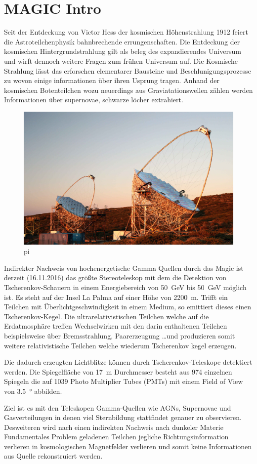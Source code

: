 \section{MAGIC Intro}%
\label{sec:magic}
Seit der Entdeckung von Victor Hess der kosmischen Höhenstrahlung 
1912 feiert die Astroteilchenphysik bahnbrechende errungenschaften.
Die Entdeckung der kosmischen Hintergrundstrahlung gilt als beleg des
expandierendes Universum und wirft dennoch weitere Fragen zum frühen Universum auf. 
Die Kosmische Strahlung lässt das erforschen elementarer Bausteine und
Beschlunigungsprozesse zu wovon
einige informationen über ihren Usprung tragen. 
Anhand der kosmischen Botenteilchen wozu neuerdings aus Graviatationswellen
zählen werden Informationen über supernovae, schwarze löcher extrahiert.
\begin{figure}
		\includegraphics[width=\linewidth]{pictures/magic.JPG}
		\caption{pi}
		\label{fig:pi}
\end{figure}
Indirekter Nachweis von hochenergetische Gamma Quellen durch das 
Magic ist derzeit (16.11.2016) das größte Stereoteleskop mit dem die
Detektion von Tscherenkov-Schauern in einem Energiebereich von
\SI{50}{\giga\electronvolt} bis \SI{50}{\giga\electronvolt} möglich ist.
Es steht auf der Insel La Palma auf einer Höhe von \SI{2200}{\meter}.
Trifft ein Teilchen mit Überlichtgeschwindigkeit in einem Medium, so emittiert
dieses einen Tscherenkov-Kegel. 
Die ultrarelativistischen Teilchen welche auf die Erdatmosphäre treffen
Wechselwirken mit den darin enthaltenen Teilchen beispielsweise über
Bremsstrahlung, Paarerzeugung \ldots und produzieren somit weitere
relativistische Teilchen welche wiederum Tscherenkov kegel erzeugen.

Die dadurch erzeugten Lichtblitze können durch Tscherenkov-Teleskope detektiert
werden.
Die Spiegelfläche von \SI{17}{\meter} Durchmesser besteht aus \num{974} einzelnen
Spiegeln die auf \num{1039} Photo Multiplier Tubes (PMTs) mit einem
Field of View von \SI{3.5}{\degree} abbilden. 

Ziel ist es mit den Teleskopen Gamma-Quellen wie AGNs, Supernovae und
Gasverteilungen in denen viel Sternbildung stattfindet genauer zu observieren. 
Desweiteren wird nach einen indirekten Nachweis nach dunkeler Materie 
Fundamentales Problem geladenen Teilchen jegliche Richtungsinformation verlieren
in kosmologischen Magnetfelder verlieren und somit keine Informationen aus
Quelle rekonstruiert werden. 

\clearpage
